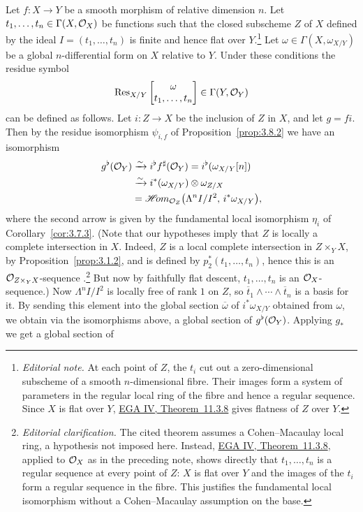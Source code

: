 Let $f\colon X\to Y$ be a smooth morphism of relative dimension $n$. Let $t_1,\dots,t_n\in\Gamma(X,\mathcal{O}_X)$ be functions such that the closed subscheme $Z$ of $X$ defined by the ideal $I=(t_1,\dots,t_n)$ is finite and hence flat \cite[\nopp IV,~\S11]{EGA} over $Y$.\footnote{\emph{Editorial note.} At each point of $Z$, the $t_i$ cut out a zero-dimensional subscheme of a smooth $n$-dimensional fibre. Their images form a system of parameters in the regular local ring of the fibre and hence a regular sequence. Since $X$ is flat over $Y$, \href{https://www.numdam.org/item/PMIHES_1966__28__5_0.pdf\#page=134}{EGA IV, Theorem~11.3.8} gives flatness of $Z$ over $Y$.} Let $\omega\in\Gamma(X,\omega_{X/Y})$ be a global $n$-differential form on $X$ relative to $Y$. Under these conditions the residue symbol
\[
\operatorname{Res}_{X/Y}\begin{bmatrix} \omega \\ t_1,\dots,t_n \end{bmatrix} \in \Gamma(Y,\mathcal{O}_Y)
\]
can be defined as follows. Let $i\colon Z\to X$ be the inclusion of $Z$ in $X$, and let $g=fi$. Then by the residue isomorphism $\psi_{i,f}$ of Proposition~\ref{prop:3.8.2} we have an isomorphism
\begin{align*}
g^{\flat}(\mathcal{O}_Y) &\xrightarrow{\sim} i^{\flat}f^{\sharp}(\mathcal{O}_Y) = i^{\flat}(\omega_{X/Y}[n]) \\
&\xrightarrow{\sim} i^*(\omega_{X/Y})\otimes\omega_{Z/X} \\
&= \mathop{\mathscr{H}\!om}\nolimits_{\mathcal{O}_Z}\bigl(\Lambda^n I/I^2,\, i^*\omega_{X/Y}\bigr),
\end{align*}
where the second arrow is given by the fundamental local isomorphism $\eta_i$ of Corollary~\ref{cor:3.7.3}. (Note that our hypotheses imply that $Z$ is locally a complete intersection in $X$. Indeed, $Z$ is a local complete intersection in $Z\times_Y X$, by Proposition~\ref{prop:3.1.2}, and is defined by $p_2^*(t_1,\dots,t_n)$, hence this is an $\mathcal{O}_{Z\times_Y X}$-sequence \cite[\nopp vol.~II, App.~6, Thm.~2]{ZS}.\footnote{\emph{Editorial clarification.} The cited theorem assumes a Cohen--Macaulay local ring, a hypothesis not imposed here. Instead, \href{https://www.numdam.org/item/PMIHES_1966__28__5_0.pdf\#page=134}{EGA IV, Theorem~11.3.8}, applied to $\mathcal{O}_X$ as in the preceding note, shows directly that $t_1,\dots,t_n$ is a regular sequence at every point of $Z$: $X$ is flat over $Y$ and the images of the $t_i$ form a regular sequence in the fibre. This justifies the fundamental local isomorphism without a Cohen--Macaulay assumption on the base.} But now by faithfully flat descent, $t_1,\dots,t_n$ is an $\mathcal{O}_X$-sequence.) Now $\Lambda^n I/I^2$ is locally free of rank $1$ on $Z$, so $\overline{t}_1\wedge\cdots\wedge\overline{t}_n$ is a basis for it. By sending this element into the global section $\overline{\omega}$ of $i^*\omega_{X/Y}$ obtained from $\omega$, we obtain via the isomorphisms above, a global section of $g^{\flat}(\mathcal{O}_Y)$. Applying $g_*$ we get a global section of
